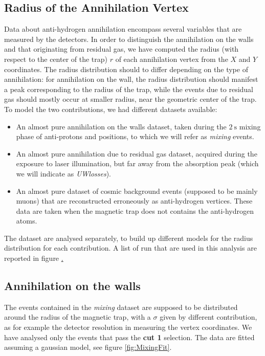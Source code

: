 \documentclass[11pt,a4paper,oneside]{article}
\begin{document}
\subsection*{Radius of the Annihilation Vertex}

Data about anti-hydrogen annihilation encompass several variables that are measured by the detectors. In order to distinguish the annihilation on the walls and that originating from residual gas, we have computed the radius (with respect to the center of the trap) $r$ of each annihilation vertex from the $X$ and $Y$ coordinates.
The radius distribution should to differ depending on the type of annihilation: for annihilation on the wall, the radius distribution should manifest a peak corresponding to the radius of the trap, while the events due to residual gas should mostly occur at smaller radius, near the geometric center of the trap.
To model the two contributions, we had different datasets available: 
\begin{itemize}
\item An almost pure annihilation on the walls dataset, taken during the $\SI{2}{\second}$ mixing phase of anti-protons and positions, to which we will refer as \textit{mixing} events.
\item An almost pure annihilation due to residual gas dataset, acquired during the exposure to laser illumination, but far away from the absorption peak (which we will indicate as \textit{UWlosses}).
\item An almost pure dataset of cosmic background events (supposed to be mainly muons) that are reconstructed erroneously as anti-hydrogen vertices. These data are taken when the magnetic trap does not contains the anti-hydrogen atoms.
\end{itemize}

The dataset are analysed separately, to build up different models for the radius distribution for each contribution. A list of run that are used in this analysis are reported in figure \href{fig:RunList}.

\subsection*{Annihilation on the walls}

The events contained in the \textit{mixing} dataset are supposed to be distributed around the radius of the magnetic trap, with a $\sigma$ given by different contribution, as for example the detector resolution in measuring the vertex coordinates. We have analysed only the events that pass the \textbf{cut 1} selection. The data are fitted assuming a gaussian model, see figure \ref{fig:MixingFit}.
\end{document}
